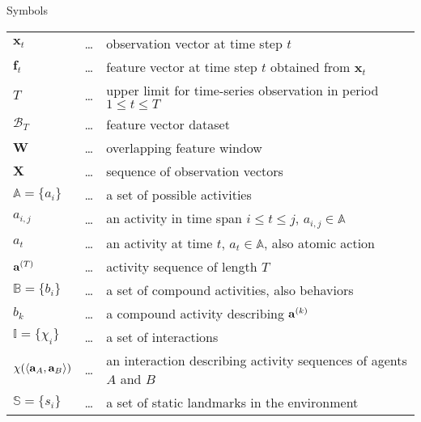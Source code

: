 
\begin{preliminary}{Symbols}



\begin{supertabular}{lcl}


$\mathbf{x}_t$				& \dots & observation vector at time step $t$\\

$\mathbf{f}_t$				& \dots & feature vector at time step $t$ obtained from $\mathbf{x}_t$\\

$T$							& \dots & upper limit for time-series observation in period $1 \leq t \leq T$\\

$\mathcal{B}_T$				& \dots & feature vector dataset\\

$\mathbf{W}$				& \dots & overlapping feature window\\

$\mathbf{X}$				& \dots & sequence of observation vectors \\

$\mathbb{A}=\{a_i\}$		& \dots & a set of possible activities \\

$a_{i,j}$						& \dots & an activity in time span $i \leq t \leq j$, $a_{i,j}\in\mathbb{A}$ \\

$a_t$						& \dots & an activity at time $t$, $a_t\in\mathbb{A}$, also atomic action \\

$\mathbf{a}^{\scriptsize(T)}$					& \dots & activity sequence of length $T$ \\

$\mathbb{B}=\{b_i\}$		& \dots & a set of compound activities, also behaviors  \\

$b_k$						& \dots & a compound activity describing $\mathbf{a}^{\scriptsize(k)}$ \\

$\mathbb{I}=\{\chi_i\}$		& \dots & a set of interactions  \\

$\chi(\langle \mathbf{a}_A,\mathbf{a}_B \rangle)$	& \dots & an interaction describing  activity sequences of agents $A$ and $B$\\

$\mathbb{S}=\{s_i\}$		& \dots & a set of static landmarks in the environment\\


\end{supertabular}
\end{preliminary}

